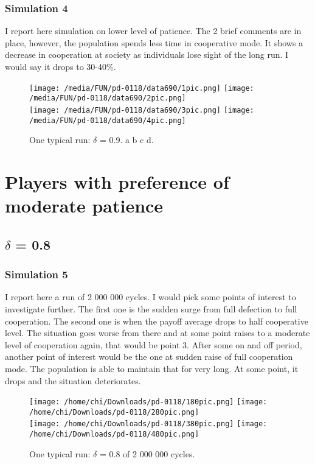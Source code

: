 \documentclass[12.5pt]{report}
\begin{document}
\subsubsection{Simulation 4}
I report here simulation on lower level of patience. The 2 brief comments are in place, however, the population spends less time in cooperative mode. It shows a decrease in cooperation at society as individuals lose sight of the long run. I would say it drops to 30-40\%.

\begin{figure}[h!]
\texttt{[image: /media/FUN/pd-0118/data690/1pic.png]}
\texttt{[image: /media/FUN/pd-0118/data690/2pic.png]}\\
\texttt{[image: /media/FUN/pd-0118/data690/3pic.png]}
\texttt{[image: /media/FUN/pd-0118/data690/4pic.png]}
\caption{One typical run: $\delta$ = 0.9. a b c d.}
\end{figure}

\section{Players with preference of moderate patience}

\subsection{$\delta$ = 0.8}

\subsubsection{Simulation 5}

I report here a run of 2 000 000 cycles. I would pick some points of interest to investigate further. The first one is the sudden surge from full defection to full cooperation. The second one is when the payoff average drops to half cooperative level. The situation goes worse from there and at some point raises to a moderate level of cooperation again, that would be point 3. After some on and off period, another point of interest would be the one at sudden raise of full cooperation mode. The population is able to maintain that for very long. At some point, it drops and the situation deteriorates.

\begin{figure}[h!]
\center
\texttt{[image: /home/chi/Downloads/pd-0118/180pic.png]}
\texttt{[image: /home/chi/Downloads/pd-0118/280pic.png]}\\
\texttt{[image: /home/chi/Downloads/pd-0118/380pic.png]}
\texttt{[image: /home/chi/Downloads/pd-0118/480pic.png]}
\caption{One typical run: $\delta$ = 0.8 of 2 000 000 cycles.}
\end{figure}
\end{document}
